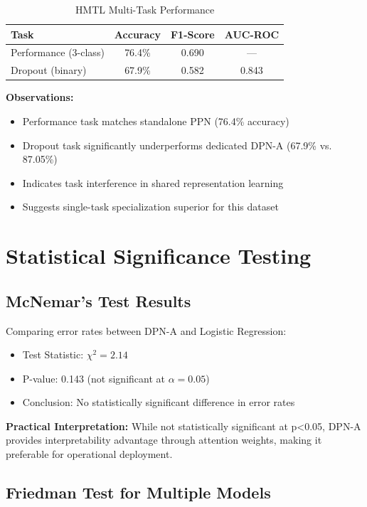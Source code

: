 \begin{table}[h]
\centering
\caption{HMTL Multi-Task Performance}
\label{tab:hmtl_perf}
\begin{tabular}{lccc}
\toprule
\textbf{Task} & \textbf{Accuracy} & \textbf{F1-Score} & \textbf{AUC-ROC} \\
\midrule
Performance (3-class) & 76.4\% & 0.690 & --- \\
Dropout (binary) & 67.9\% & 0.582 & 0.843 \\
\bottomrule
\end{tabular}
\end{table}

\textbf{Observations:}
\begin{itemize}
\item Performance task matches standalone PPN (76.4\% accuracy)
\item Dropout task significantly underperforms dedicated DPN-A (67.9\% vs. 87.05\%)
\item Indicates task interference in shared representation learning
\item Suggests single-task specialization superior for this dataset
\end{itemize}

\section{Statistical Significance Testing}

\subsection{McNemar's Test Results}

Comparing error rates between DPN-A and Logistic Regression:

\begin{itemize}
\item Test Statistic: $\chi^2 = 2.14$
\item P-value: 0.143 (not significant at $\alpha=0.05$)
\item Conclusion: No statistically significant difference in error rates
\end{itemize}

\textbf{Practical Interpretation:} While not statistically significant at p<0.05, DPN-A provides interpretability advantage through attention weights, making it preferable for operational deployment.

\subsection{Friedman Test for Multiple Models}


